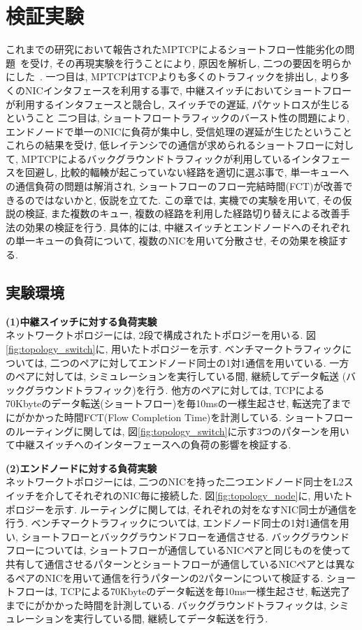 \documentclass[11pt, a4paper, twocolumn]{jsarticle}
\begin{document}
\section{検証実験}
\label{sec:verification}
これまでの研究において報告されたMPTCPによるショートフロー性能劣化の問題~\cite{improving}を受け, その再現実験を行うことにより,
原因を解析し, 二つの要因を明らかにした~\cite{mptcp_ana}.
一つ目は, MPTCPはTCPよりも多くのトラフィックを排出し, より多くのNICインタフェースを利用する事で,
中継スイッチにおいてショートフローが利用するインタフェースと競合し, スイッチでの遅延, パケットロスが生じるということ
二つ目は, ショートフロートラフィックのバースト性の問題により, エンドノードで単一のNICに負荷が集中し, 受信処理の遅延が生じたということ
これらの結果を受け,
低レイテンシでの通信が求められるショートフローに対して, MPTCPによるバックグラウンドトラフィックが利用しているインタフェースを回避し,
比較的輻輳が起こっていない経路を適切に選ぶ事で,
単一キューへの通信負荷の問題は解消され, ショートフローのフロー完結時間(FCT)が改善できるのではないかと, 仮説を立てた.
この章では, 実機での実験を用いて, その仮説の検証,
また複数のキュー, 複数の経路を利用した経路切り替えによる改善手法の効果の検証を行う.
具体的には, 中継スイッチとエンドノードへのそれぞれの単一キューの負荷について, 複数のNICを用いて分散させ, その効果を検証する.

\subsection{実験環境}
{\bf (1)中継スイッチに対する負荷実験}\\
ネットワークトポロジーには, 2段で構成されたトポロジーを用いる.
図\ref{fig:topology_switch}に, 用いたトポロジーを示す.
ベンチマークトラフィックについては, 二つのペアに対してエンドノード同士の1対1通信を用いている.
一方のペアに対しては, シミュレーションを実行している間, 継続してデータ転送 (バックグラウンドトラフィック)を行う.
他方のペアに対しては, TCPによる70Kbyteのデータ転送(ショートフロー)を毎10msの一様生起させ,
転送完了までにがかかった時間FCT(Flow Completion Time)を計測している.
ショートフローのルーティングに関しては,
図\ref{fig:topology_switch}に示す3つのパターンを用いて中継スイッチへのインターフェースへの負荷の影響を検証する.


{\bf (2)エンドノードに対する負荷実験}\\
ネットワークトポロジーには, 二つのNICを持った二つエンドノード同士をL2スイッチを介してそれぞれのNIC毎に接続した.
図\ref{fig:topology_node}に, 用いたトポロジーを示す.
ルーティングに関しては, それぞれの対をなすNIC同士が通信を行う.
ベンチマークトラフィックについては, エンドノード同士の1対1通信を用い, ショートフローとバックグラウンドフローを通信させる.
バックグラウンドフローについては,
ショートフローが通信しているNICペアと同じものを使って共有して通信させるパターンとショートフローが通信しているNICペアとは異なるペアのNICを用いて通信を行うパターンの2パターンについて検証する.
ショートフローは, TCPによる70Kbyteのデータ転送を毎10ms一様生起させ, 転送完了までにがかかった時間を計測している.
バックグラウンドトラフィックは, シミュレーションを実行している間, 継続してデータ転送を行う.
\end{document}
